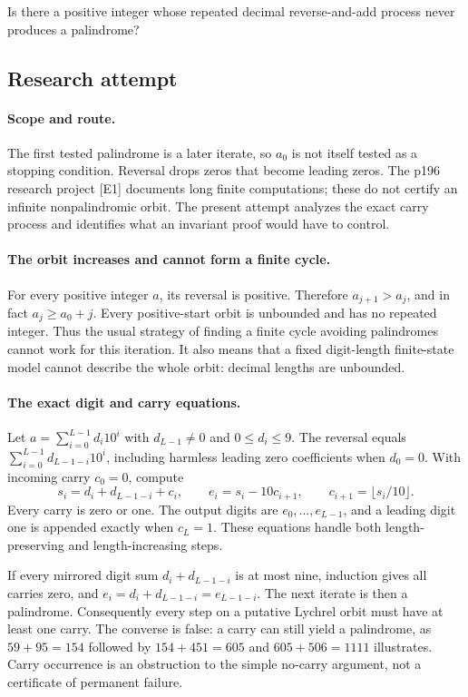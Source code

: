 \documentclass[11pt,a4paper]{article}
\begin{document}
Is there a positive integer whose repeated decimal reverse-and-add process never produces a palindrome?

\subsection{Research attempt}

\paragraph{Scope and route.}
The first tested palindrome is a later iterate, so $a_0$ is not itself
tested as a stopping condition. Reversal drops zeros that become
leading zeros. The p196 research project [E1] documents long finite
computations; these do not certify an infinite nonpalindromic orbit.
The present attempt analyzes the exact carry process and identifies
what an invariant proof would have to control.

\paragraph{The orbit increases and cannot form a finite cycle.}
For every positive integer $a$, its reversal is positive. Therefore
$a_{j+1}>a_j$, and in fact $a_j\ge a_0+j$. Every positive-start orbit
is unbounded and has no repeated integer. Thus the usual strategy of
finding a finite cycle avoiding palindromes cannot work for this
iteration. It also means that a fixed digit-length finite-state model
cannot describe the whole orbit: decimal lengths are unbounded.

\paragraph{The exact digit and carry equations.}
Let $a=\sum_{i=0}^{L-1}d_i10^i$ with $d_{L-1}\ne0$ and
$0\le d_i\le9$. The reversal equals
$\sum_{i=0}^{L-1}d_{L-1-i}10^i$, including harmless leading zero
coefficients when $d_0=0$. With incoming carry $c_0=0$, compute
\[
 s_i=d_i+d_{L-1-i}+c_i,\qquad
 e_i=s_i-10c_{i+1},\qquad c_{i+1}=\lfloor s_i/10\rfloor.
\]
Every carry is zero or one. The output digits are $e_0,\ldots,e_{L-1}$,
and a leading digit one is appended exactly when $c_L=1$. These
equations handle both length-preserving and length-increasing steps.

If every mirrored digit sum $d_i+d_{L-1-i}$ is at most nine, induction
gives all carries zero, and $e_i=d_i+d_{L-1-i}=e_{L-1-i}$. The
next iterate is then a palindrome. Consequently every step on a
putative Lychrel orbit must have at least one carry. The converse is
false: a carry can still yield a palindrome, as $59+95=154$ followed
by $154+451=605$ and $605+506=1111$ illustrates. Carry occurrence
is an obstruction to the simple no-carry argument, not a certificate
of permanent failure.
\end{document}
